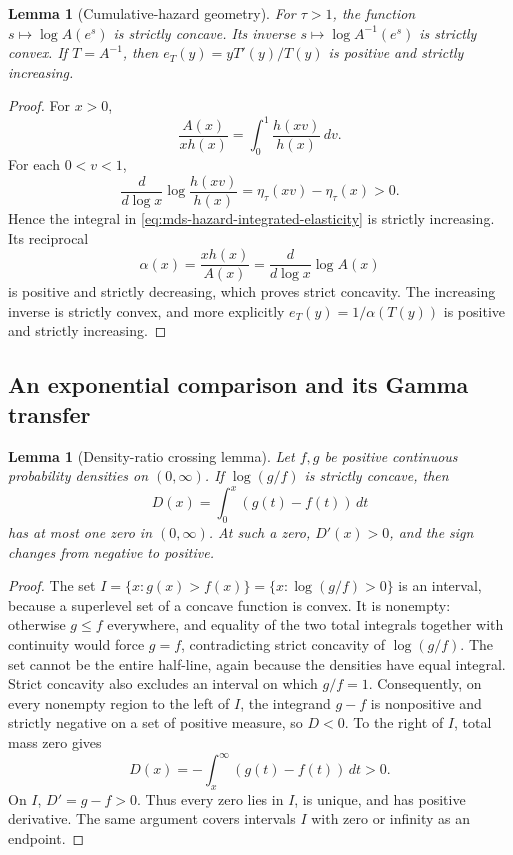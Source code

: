 \documentclass[11pt]{article}
\newtheorem{lemma}[theorem]{Lemma}
\theoremstyle{definition}
\theoremstyle{remark}
\newcommand{\1}{\mathbf 1}
\begin{document}
\begin{lemma}[Cumulative-hazard geometry]
\label{lem:mds-cumulative-hazard-geometry}
For \(\tau>1\), the function \(s\mapsto\log A(e^s)\) is strictly
concave. Its inverse \(s\mapsto\log A^{-1}(e^s)\) is strictly convex.
If \(T=A^{-1}\), then
\(e_T(y)=yT'(y)/T(y)\) is positive and strictly increasing.
\end{lemma}
\begin{proof}
For \(x>0\),
\begin{equation}\label{eq:mds-hazard-integrated-elasticity}
 \frac{A(x)}{xh(x)}=\int_0^1\frac{h(xv)}{h(x)}\,dv.
\end{equation}
For each \(0<v<1\),
\[
 \frac{d}{d\log x}\log\frac{h(xv)}{h(x)}
 =\eta_\tau(xv)-\eta_\tau(x)>0.
\]
Hence the integral in \eqref{eq:mds-hazard-integrated-elasticity} is
strictly increasing. Its reciprocal
\[
 \alpha(x)=\frac{xh(x)}{A(x)}
 =\frac{d}{d\log x}\log A(x)
\]
is positive and strictly decreasing, which proves strict concavity.
The increasing inverse is strictly convex, and more explicitly
\(e_T(y)=1/\alpha(T(y))\) is positive and strictly increasing.
\end{proof}

\subsection{An exponential comparison and its Gamma transfer}

\begin{lemma}[Density-ratio crossing lemma]
\label{lem:mds-density-ratio-crossing}
Let \(f,g\) be positive continuous probability densities on
\((0,\infty)\). If \(\log(g/f)\) is strictly concave, then
\[
 D(x)=\int_0^x(g(t)-f(t))\,dt
\]
has at most one zero in \((0,\infty)\). At such a zero,
\(D'(x)>0\), and the sign changes from negative to positive.
\end{lemma}
\begin{proof}
The set \(I=\{x:g(x)>f(x)\}=\{x:\log(g/f)>0\}\) is an interval,
because a superlevel set of a concave function is convex.  It is
nonempty: otherwise \(g\le f\) everywhere, and equality of the two
total integrals together with continuity would force \(g=f\),
contradicting strict concavity of \(\log(g/f)\).  The set cannot be the
entire half-line, again because the densities have equal integral.
Strict concavity also excludes an interval on which \(g/f=1\).
Consequently, on every nonempty region to the left of \(I\), the
integrand \(g-f\) is nonpositive and strictly negative on a set of
positive measure, so \(D<0\).  To the right of \(I\), total mass zero
gives
\[
 D(x)=-\int_x^\infty(g(t)-f(t))\,dt>0.
\]
On \(I\), \(D'=g-f>0\). Thus every zero lies in \(I\), is unique,
and has positive derivative. The same argument covers intervals
\(I\) with zero or infinity as an endpoint.
\end{proof}
\end{document}

